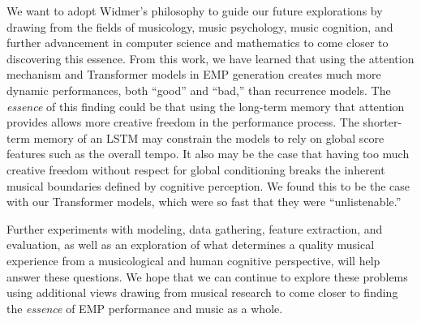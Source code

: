 We want to adopt Widmer's philosophy to guide our future explorations by drawing from the fields of musicology, music psychology, music cognition, and further advancement in computer science and mathematics to come closer to discovering this essence. From this work, we have learned that using the attention mechanism and Transformer models in EMP generation creates much more dynamic performances, both ``good'' and ``bad,'' than recurrence models. The \emph{essence} of this finding could be that using the long-term memory that attention provides allows more creative freedom in the performance process. The shorter-term memory of an LSTM may constrain the models to rely on global score features such as the overall tempo. It also may be the case that having too much creative freedom without respect for global conditioning breaks the inherent musical boundaries defined by cognitive perception. We found this to be the case with our Transformer models, which were so fast that they were ``unlistenable.'' 

Further experiments with modeling, data gathering, feature extraction, and evaluation, as well as an exploration of what determines a quality musical experience from a musicological and human cognitive perspective, will help answer these questions. We hope that we can continue to explore these problems using additional views drawing from musical research to come closer to finding the \emph{essence} of EMP performance and music as a whole. 
